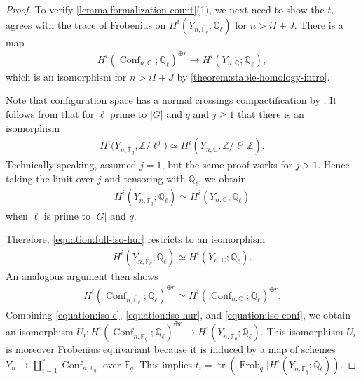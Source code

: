 \documentclass[12 pt]{amsart}
\theoremstyle{plain}
\theoremstyle{definition}
\theoremstyle{remark}
\numberwithin{equation}{section}
\DeclareMathOperator\tr{tr}
\DeclareMathOperator\frob{Frob}
\DeclareMathOperator\conf{Conf}
\begin{document}
\begin{proof}
	To verify 
	\autoref{lemma:formalization-count}(1),
	we next need to show the $t_i$
	agrees with the trace of Frobenius on $H^i(Y_{n, \overline{\mathbb
	F}_q}; \mathbb Q_\ell)$ for $n > i I + J$.
	There is a map 
	\begin{align}
		\label{equation:iso-c}
		H^i(\conf_{n,\mathbb C};\mathbb Q_\ell)^{\oplus r} \to H^i(Y_{n,
			\mathbb C};\mathbb Q_\ell),
	\end{align}
which is an isomorphism for
	$n> iI + J$
	by \autoref{theorem:stable-homology-intro}.
	
	Note that configuration space has a normal crossings compactification by
	\cite[Corollary
	B.1.4]{ellenbergL:homological-stability-for-generalized-hurwitz-spaces}.
	It follows from \cite[Proposition
	7.7]{EllenbergVW:cohenLenstra} 
	that for $\ell$ prime to $|G|$ and $q$ and $j \geq 1$
	that
	there is an isomorphism 
\begin{align}
	\label{equation:}
	H^i(Y_{n,\overline{\mathbb F}_q}, \mathbb
	Z/\ell^j \mathbb) \simeq
	H^i(Y_{n,\mathbb C}, \mathbb Z/\ell^j \mathbb Z).
	\end{align}
	Technically speaking, 
\cite[Proposition
7.7]{EllenbergVW:cohenLenstra} assumed $j = 1$, but the same proof works for $j
> 1$.
Hence taking the limit over $j$ and tensoring with $\mathbb Q_\ell$, we obtain
	\begin{align}
		\label{equation:full-iso-hur}
		H^i(Y_{n,\overline{\mathbb F}_q}; \mathbb
	Q_\ell) \simeq
	H^i(Y_{n,\mathbb C}; \mathbb Q_\ell)
	\end{align}
	when $\ell$ is prime to $|G|$ and $q$.
	
	Therefore, \eqref{equation:full-iso-hur}
	restricts to an isomorphism
	\begin{align}
		\label{equation:iso-hur}
		H^i(Y_{n,\overline{\mathbb F}_q}; \mathbb
	Q_\ell) \simeq
	H^i(Y_{n,\mathbb C}; \mathbb Q_\ell).
	\end{align}
	An analogous argument then shows 
	\begin{align}
		\label{equation:iso-conf}
	H^i(\conf_{n,\overline{\mathbb F}_q};\mathbb Q_\ell)^{\oplus r} \simeq
	H^i(\conf_{n,\mathbb C};\mathbb Q_\ell)^{\oplus r}.
	\end{align}
	Combining \eqref{equation:iso-c}, \eqref{equation:iso-hur}, and \eqref{equation:iso-conf}, we obtain an 
	isomorphism
$U_i : 
H^i(\conf_{n,{\overline{\mathbb F}_q}};\mathbb
Q_\ell)^{\oplus r} \to H^i(Y_{n,\overline{\mathbb F}_q} ;\mathbb Q_\ell)$.
This isomorphism $U_i$ is moreover Frobenius equivariant because it is induced by a map of
schemes $Y_n \to \coprod_{i=1}^r \conf_{n,\mathbb F_q}$ over $\mathbb F_q$.
	This implies 
	$t_i = \tr(\frob_q|H^i(Y_{n, \overline{\mathbb
	F}_q}; \mathbb Q_\ell))$.


\end{proof}
\end{document}
